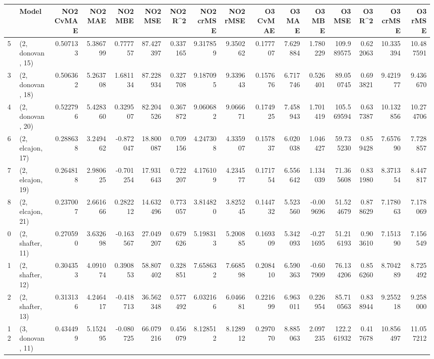 \begin{tabular}{llrrrrrrrrrrrrrr}
\toprule
{} &             Model &  NO2 CvMAE &   NO2 MAE &   NO2 MBE &    NO2 MSE &   NO2 R\textasciicircum2 &  NO2 crMSE &  NO2 rMSE &  O3 CvMAE &    O3 MAE &    O3 MBE &      O3 MSE &    O3 R\textasciicircum2 &   O3 crMSE &    O3 rMSE \\
\midrule
5  &  (2, donovan, 15) &   0.507133 &  5.386799 &  0.777757 &  87.427397 &  0.337165 &   9.317859 &  9.350262 &  0.177707 &  7.629884 &  1.780229 &  109.989575 &  0.622063 &  10.335394 &  10.487591 \\
3  &  (2, donovan, 18) &   0.506362 &  5.263708 &  1.681134 &  87.228934 &  0.327708 &   9.187095 &  9.339643 &  0.157676 &  6.717746 &  0.526401 &   89.050745 &  0.693821 &   9.421977 &   9.436670 \\
4  &  (2, donovan, 20) &   0.522796 &  5.428360 &  0.329507 &  82.204526 &  0.367872 &   9.060682 &  9.066671 &  0.174925 &  7.458943 &  1.701419 &  105.569594 &  0.637387 &  10.132856 &  10.274706 \\
6  &  (2, elcajon, 17) &   0.288638 &  3.249462 & -0.872047 &  18.800087 &  0.709156 &   4.247308 &  4.335907 &  0.157837 &  6.020038 &  1.046427 &   59.735230 &  0.859428 &   7.657690 &   7.728857 \\
7  &  (2, elcajon, 19) &   0.264818 &  2.980625 & -0.701254 &  17.931643 &  0.722207 &   4.176109 &  4.234577 &  0.171754 &  6.556642 &  1.134039 &   71.365608 &  0.831980 &   8.371354 &   8.447817 \\
8  &  (2, elcajon, 21) &   0.237007 &  2.661666 &  0.282212 &  14.632496 &  0.773057 &   3.814820 &  3.825245 &  0.144732 &  5.523560 & -0.009696 &   51.524679 &  0.878629 &   7.178063 &   7.178069 \\
0  &  (2, shafter, 11) &   0.270590 &  3.632698 & -0.163567 &  27.049207 &  0.679626 &   5.198313 &  5.200885 &  0.169309 &  5.342093 & -0.271695 &   51.216193 &  0.903610 &   7.151390 &   7.156549 \\
1  &  (2, shafter, 12) &   0.304353 &  4.091074 &  0.390853 &  58.807402 &  0.328851 &   7.658632 &  7.668598 &  0.208410 &  6.590363 & -0.607909 &   76.134206 &  0.856260 &   8.704289 &   8.725492 \\
2  &  (2, shafter, 13) &   0.313136 &  4.246417 & -0.418713 &  36.562348 &  0.577492 &   6.032166 &  6.046681 &  0.221699 &  6.963011 &  0.226954 &   85.710563 &  0.838944 &   9.255218 &   9.258000 \\
12 &  (3, donovan, 11) &   0.434499 &  5.152495 & -0.080725 &  66.079216 &  0.456079 &   8.128512 &  8.128912 &  0.297070 &  8.885063 &  2.097235 &  122.261932 &  0.417678 &  10.856497 &  11.057212 \\

\end{tabular}
